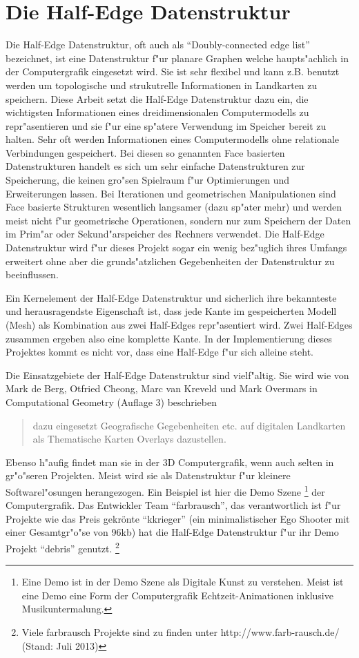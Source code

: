 \documentclass[pagesize, paper=a4, fontsize=12pt,titlepage=true, headings=small, headnosepline, abstractoff, liststotoc, nochapterprefix, plainheadsepline]{scrreprt}
\newcommand{\HES}{Half-Edge Datenstruktur }
\begin{document}
	\section {Die \HES}
		Die Half-Edge Datenstruktur, oft auch als "`Doubly-connected edge list"' bezeichnet, ist eine Datenstruktur f"ur planare Graphen welche haupts"achlich in der Computergrafik eingesetzt wird. Sie ist sehr flexibel und kann z.B. benutzt werden um topologische und strukutrelle Informationen in Landkarten zu speichern. Diese Arbeit setzt die \HES dazu ein, die wichtigsten Informationen eines dreidimensionalen Computermodells zu repr"asentieren und sie f"ur eine sp"atere Verwendung im Speicher bereit zu halten. Sehr oft werden Informationen eines Computermodells ohne relationale Verbindungen gespeichert. Bei diesen so genannten Face basierten Datenstrukturen handelt es sich um sehr einfache Datenstrukturen zur Speicherung, die keinen gro"sen Spielraum f"ur Optimierungen und Erweiterungen lassen. Bei Iterationen und geometrischen Manipulationen sind Face basierte Strukturen wesentlich langsamer (dazu sp"ater mehr) und werden meist nicht f"ur geometrische Operationen, sondern nur zum Speichern der Daten im Prim"ar oder Sekund"arspeicher des Rechners verwendet. Die \HES wird f"ur dieses Projekt sogar ein wenig bez"uglich ihres Umfangs erweitert ohne aber die grunds"atzlichen Gegebenheiten der Datenstruktur zu beeinflussen.

Ein Kernelement der \HES und sicherlich ihre bekannteste und herausragendste Eigenschaft ist, dass jede Kante im gespeicherten Modell (Mesh) als Kombination aus zwei Half-Edges repr"asentiert wird. Zwei Half-Edges zusammen ergeben also eine komplette Kante. In der Implementierung dieses Projektes kommt es nicht vor, dass eine Half-Edge f"ur sich alleine steht.

Die Einsatzgebiete der \HES sind vielf"altig. Sie wird wie von Mark de Berg, Otfried Cheong, Marc van Kreveld und Mark Overmars in Computational Geometry \cite{vanMarkdeBerg.2008} (Auflage 3) beschrieben  \begin{quote}dazu eingesetzt Geografische Gegebenheiten etc. auf digitalen Landkarten  als Thematische Karten Overlays dazustellen. \cite[S.~29]{vanMarkdeBerg.2008}\end{quote} Ebenso h"aufig findet man sie in der 3D Computergrafik, wenn auch selten in gr"o"seren Projekten. Meist wird sie als Datenstruktur f"ur kleinere Softwarel"osungen herangezogen. Ein Beispiel ist hier die Demo Szene \footnote{Eine Demo ist in der Demo Szene als Digitale Kunst zu verstehen. Meist ist eine Demo eine Form der Computergrafik Echtzeit-Animationen inklusive Musikuntermalung.} der Computergrafik. Das Entwickler Team "`farbrausch"', das verantwortlich ist f"ur Projekte wie das Preis gekrönte "`kkrieger"' (ein minimalistischer Ego Shooter mit einer Gesamtgr"o"se von 96kb) hat die \HES f"ur ihr Demo Projekt "`debris"' genutzt. \footnote{Viele farbrausch Projekte sind zu finden unter http://www.farb-rausch.de/ (Stand: Juli 2013)}
\end{document}
